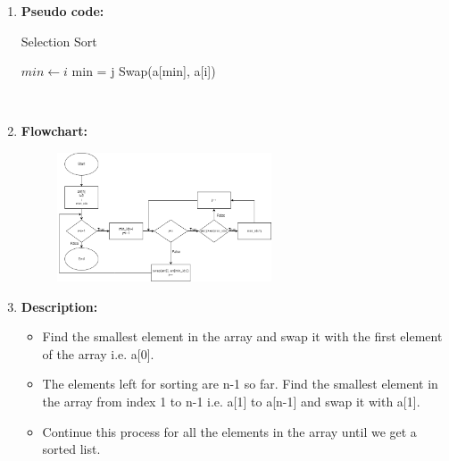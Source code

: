 \documentclass[11pt,a4paper]{article}
\begin{document}
{\begin{enumerate}[label=\textbf{\arabic*})]
					Due to being an in-place sorting algorithm, the space complexity is $\mathcal{O}$(1).
				\\[12pt]
				\item \textbf{Pseudo code:}
				\begin{algorithm}
                \caption{Selection Sort}
                \begin{algorithmic}[1]
                		\State $min \gets i$
                				min = j
                			\EndIf
                		\EndFor
                			\State Swap(a[min], a[i])
                		\EndIf
                	\EndFor
                \EndProcedure
                \end{algorithmic}
                \end{algorithm}
				\\[12pt]
				\item \textbf{Flowchart:}
					\begin{figure}[H]
						\centering 
						\includegraphics[width=0.6\textwidth]{SelectionSort Flowchart}
					\end{figure}
				
				\item \textbf{Description:}
					\begin{itemize}
						\item Find the smallest element in the array and swap it with the first element of the array i.e. a[0].
						\item The elements left for sorting are n-1 so far. Find the smallest element in the array from index 1 to n-1 i.e. a[1] to a[n-1] and swap it with a[1].
						\item Continue this process for all the elements in the array until we get a sorted list.
					\end{itemize}
				

\end{enumerate}}
\end{document}
